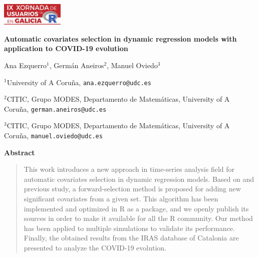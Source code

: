 \documentclass[twoside]{article}
\begin{document}
\begin{flushright}
\includegraphics[angle=0,keepaspectratio,width=3cm]{logo.pdf}
\end{flushright}

 \vspace{20pt}

\begin{center}
\textbf{Automatic covariates selection in dynamic regression models with application to COVID-19 evolution}

\vspace{0.15cm}

Ana Ezquerro$^{1}$, Germán Aneiros$^{2}$, Manuel Oviedo$^{3}$
\end{center}

\vspace{0.06cm}

$^{1}$University of A Coruña, \texttt{ana.ezquerro@udc.es}

$^{2}$CITIC, Grupo MODES, Departamento de Matemáticas, University of A Coruña, \texttt{german.aneiros@udc.es}


$^{3}$CITIC, Grupo MODES, Departamento de Matemáticas, University of A Coruña, \texttt{manuel.oviedo@udc.es}


\begin{center}
\textbf{Abstract}
\end{center}


\begin{quotation}
    This work introduces a new approach in time-series analysis field for automatic covariates selection in dynamic regression models. Based on \cite{cryer2008time} and \cite{hyndman2018forecasting} previous study, a forward-selection method is proposed for adding new significant covariates from a given set. This algorithm has been implemented and optimized in R as a package, and we openly publish its sources in order to make it available for all the R community. Our method has been applied to multiple simulations to validate its performance. Finally, the obtained results from the IRAS database of Catalonia are presented to analyze the COVID-19 evolution. 
\end{quotation}
\end{document}
